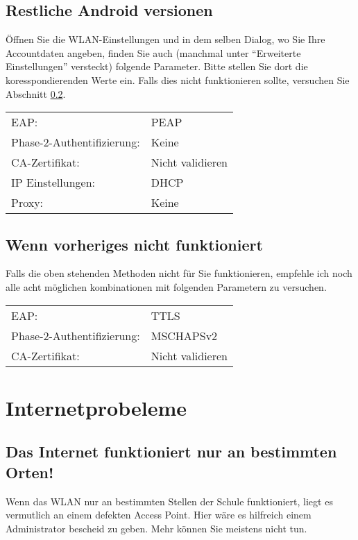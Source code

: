 \documentclass[12pt, a4paper]{article}
\begin{document}
  \subsection{Restliche Android versionen}
  Öffnen Sie die WLAN-Einstellungen und in dem selben Dialog, wo Sie Ihre Accountdaten angeben, finden Sie auch (manchmal unter "`Erweiterte Einstellungen"' versteckt) folgende Parameter.
  Bitte stellen Sie dort die koresspondierenden Werte ein.
  Falls dies nicht funktionieren sollte, versuchen Sie Abschnitt \ref{didntwork}.
  \newline
  \newline
  \begin{tabular}{l l}
    EAP:                          & PEAP \\
    Phase-2-Authentifizierung:    & Keine \\
    CA-Zertifikat:                & Nicht validieren \\
    IP Einstellungen:             & DHCP \\
    Proxy:                        & Keine \\
  \end{tabular}

  \subsection{Wenn vorheriges nicht funktioniert} \label{didntwork}
  Falls die oben stehenden Methoden nicht für Sie funktionieren, empfehle ich noch alle acht möglichen kombinationen mit folgenden Parametern zu versuchen.
  \newline
  \newline
  \begin{tabular}{l l}
    EAP:                          & TTLS \\
    Phase-2-Authentifizierung:    & MSCHAPSv2 \\
    CA-Zertifikat:                & Nicht validieren \\
  \end{tabular}

  \section{Internetprobeleme}

  \subsection{Das Internet funktioniert nur an bestimmten Orten!}
  Wenn das WLAN nur an bestimmten Stellen der Schule funktioniert, liegt es vermutlich an einem defekten Access Point. Hier wäre es hilfreich einem Administrator bescheid zu geben. Mehr können Sie meistens nicht tun.
\end{document}
